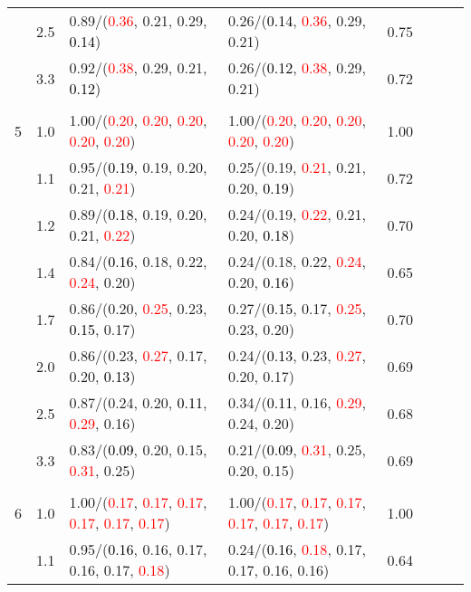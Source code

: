 \documentclass[10pt,a4paper]{report}
\begin{document}
\begin{table}[!htbp]
\begin{center}
{\begin{tabular}{ccllcccc}
			&2.5&0.89/(\textcolor{red}{0.36}, 0.21, 0.29, \textcolor{black}{0.14})&0.26/(\textcolor{black}{0.14}, \textcolor{red}{0.36}, 0.29, 0.21)&0.75\\
			&3.3&0.92/(\textcolor{red}{0.38}, 0.29, 0.21, \textcolor{black}{0.12})&0.26/(\textcolor{black}{0.12}, \textcolor{red}{0.38}, 0.29, 0.21)&0.72\\
			&&&&\\
			5			&1.0&1.00/(\textcolor{red}{0.20}, \textcolor{red}{0.20}, \textcolor{red}{0.20}, \textcolor{red}{0.20}, \textcolor{red}{0.20})&1.00/(\textcolor{red}{0.20}, \textcolor{red}{0.20}, \textcolor{red}{0.20}, \textcolor{red}{0.20}, \textcolor{red}{0.20})&1.00\\
			&1.1&0.95/(\textcolor{black}{0.19}, 0.19, 0.20, 0.21, \textcolor{red}{0.21})&0.25/(0.19, \textcolor{red}{0.21}, 0.21, 0.20, \textcolor{black}{0.19})&0.72\\
			&1.2&0.89/(\textcolor{black}{0.18}, 0.19, 0.20, 0.21, \textcolor{red}{0.22})&0.24/(0.19, \textcolor{red}{0.22}, 0.21, 0.20, \textcolor{black}{0.18})&0.70\\
			&1.4&0.84/(\textcolor{black}{0.16}, 0.18, 0.22, \textcolor{red}{0.24}, 0.20)&0.24/(0.18, 0.22, \textcolor{red}{0.24}, 0.20, \textcolor{black}{0.16})&0.65\\
			&1.7&0.86/(0.20, \textcolor{red}{0.25}, 0.23, \textcolor{black}{0.15}, 0.17)&0.27/(\textcolor{black}{0.15}, 0.17, \textcolor{red}{0.25}, 0.23, 0.20)&0.70\\
			&2.0&0.86/(0.23, \textcolor{red}{0.27}, 0.17, 0.20, \textcolor{black}{0.13})&0.24/(\textcolor{black}{0.13}, 0.23, \textcolor{red}{0.27}, 0.20, 0.17)&0.69\\
			&2.5&0.87/(0.24, 0.20, \textcolor{black}{0.11}, \textcolor{red}{0.29}, 0.16)&0.34/(\textcolor{black}{0.11}, 0.16, \textcolor{red}{0.29}, 0.24, 0.20)&0.68\\
			&3.3&0.83/(\textcolor{black}{0.09}, 0.20, 0.15, \textcolor{red}{0.31}, 0.25)&0.21/(\textcolor{black}{0.09}, \textcolor{red}{0.31}, 0.25, 0.20, 0.15)&0.69\\
			&&&&\\
			6			&1.0&1.00/(\textcolor{red}{0.17}, \textcolor{red}{0.17}, \textcolor{red}{0.17}, \textcolor{red}{0.17}, \textcolor{red}{0.17}, \textcolor{red}{0.17})&1.00/(\textcolor{red}{0.17}, \textcolor{red}{0.17}, \textcolor{red}{0.17}, \textcolor{red}{0.17}, \textcolor{red}{0.17}, \textcolor{red}{0.17})&1.00\\
			&1.1&0.95/(\textcolor{black}{0.16}, 0.16, 0.17, 0.16, 0.17, \textcolor{red}{0.18})&0.24/(\textcolor{black}{0.16}, \textcolor{red}{0.18}, 0.17, 0.17, 0.16, 0.16)&0.64\\

\end{tabular}}
\end{center}
\end{table}
\end{document}
